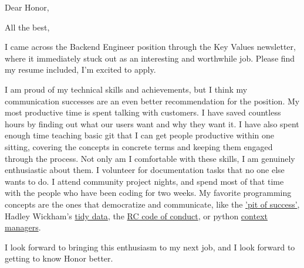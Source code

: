 \documentclass[11pt,a4paper,sans]{moderncv}        %
\begin{document}
\recipient{~}{~}
\date{\today}
\opening{Dear Honor,}
\closing{All the best,}
\makelettertitle

I came across the Backend Engineer position through the Key Values newsletter, where it immediately stuck out as an interesting and worthwhile job.
Please find my resume included, I'm excited to apply.

I am proud of my technical skills and achievements, but I think my communication successes are an even better recommendation for the position.
My most productive time is spent talking with customers.
I have saved countless hours by finding out what our users want and why they want it.
I have also spent enough time teaching basic git that I can get people productive within one sitting, covering the concepts in concrete terms and keeping them engaged through the process.
Not only am I comfortable with these skills, I am genuinely enthusiastic about them.
I volunteer for documentation tasks that no one else wants to do.
I attend community project nights, and spend most of that time with the people who have been coding for two weeks.
My favorite programming concepts are the ones that democratize and communicate, like the \textcolor{cyan}{\href{https://blog.codinghorror.com/falling-into-the-pit-of-success/}{'pit of success'}}, Hadley Wickham's \textcolor{cyan}{\href{https://cran.r-project.org/web/packages/tidyverse/vignettes/manifesto.html}{tidy data}}, the \textcolor{cyan}{\href{https://www.recurse.com/code-of-conduct}{RC code of conduct}}, or python \textcolor{cyan}{\href{http://arnavk.com/posts/python-context-managers/}{context managers}}.

I look forward to bringing this enthusiasm to my next job, and I look forward to getting to know Honor better.

\makeletterclosing
\end{document}
